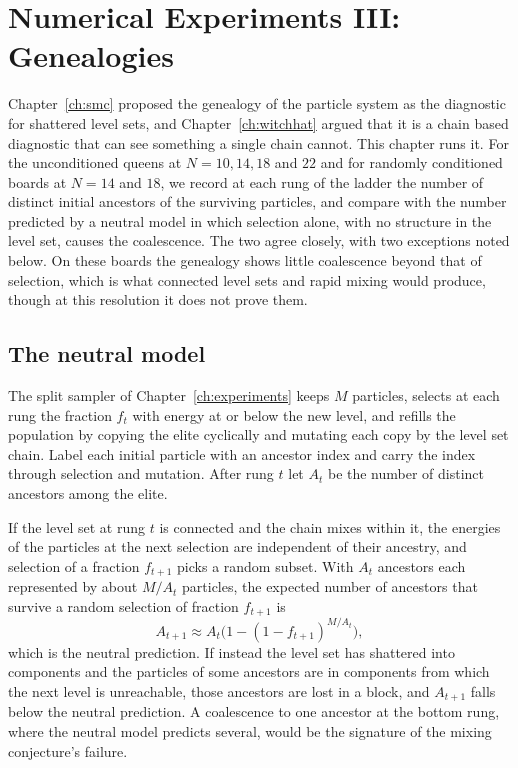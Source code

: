 \chapter{Numerical Experiments III: Genealogies}
\label{ch:genealogy}

Chapter~\ref{ch:smc} proposed the genealogy of the particle system as the diagnostic for shattered level sets, and Chapter~\ref{ch:witchhat} argued that it is a chain based diagnostic that can see something a single chain cannot. This chapter runs it. For the unconditioned queens at $N = 10, 14, 18$ and $22$ and for randomly conditioned boards at $N = 14$ and $18$, we record at each rung of the ladder the number of distinct initial ancestors of the surviving particles, and compare with the number predicted by a neutral model in which selection alone, with no structure in the level set, causes the coalescence. The two agree closely, with two exceptions noted below. On these boards the genealogy shows little coalescence beyond that of selection, which is what connected level sets and rapid mixing would produce, though at this resolution it does not prove them.

\section{The neutral model}

The split sampler of Chapter~\ref{ch:experiments} keeps $M$ particles, selects at each rung the fraction $f_t$ with energy at or below the new level, and refills the population by copying the elite cyclically and mutating each copy by the level set chain. Label each initial particle with an ancestor index and carry the index through selection and mutation. After rung $t$ let $A_t$ be the number of distinct ancestors among the elite.

If the level set at rung $t$ is connected and the chain mixes within it, the energies of the particles at the next selection are independent of their ancestry, and selection of a fraction $f_{t+1}$ picks a random subset. With $A_t$ ancestors each represented by about $M / A_t$ particles, the expected number of ancestors that survive a random selection of fraction $f_{t+1}$ is
\[
A_{t+1} \approx A_t \big( 1 - (1 - f_{t+1})^{M / A_t} \big) ,
\]
which is the neutral prediction. If instead the level set has shattered into components and the particles of some ancestors are in components from which the next level is unreachable, those ancestors are lost in a block, and $A_{t+1}$ falls below the neutral prediction. A coalescence to one ancestor at the bottom rung, where the neutral model predicts several, would be the signature of the mixing conjecture's failure.


